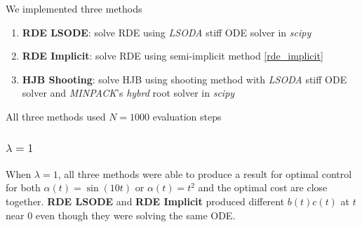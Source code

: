 We implemented three methods 
\begin{enumerate}
	\item \textbf{RDE LSODE}: solve RDE using \textit{LSODA} stiff ODE solver in \textit{scipy}
	\item \textbf{RDE Implicit}: solve RDE using semi-implicit method \ref{rde_implicit}
	\item \textbf{HJB Shooting}: solve HJB using shooting method with \textit{LSODA} stiff ODE solver and \textit{MINPACK}’s \textit{hybrd} root solver in \textit{scipy}
\end{enumerate}

All three methods used $N = 1000$ evaluation steps

\subsubsection{$\lambda = 1$}

When $\lambda = 1$, all three methods were able to produce a result for optimal control for both $\alpha(t) = \sin(10 t)$ or $\alpha(t) = t^2$ and the optimal cost are close together. \textbf{RDE LSODE} and \textbf{RDE Implicit} produced different $b(t) c(t)$ at $t$ near $0$ even though they were solving the same ODE.

